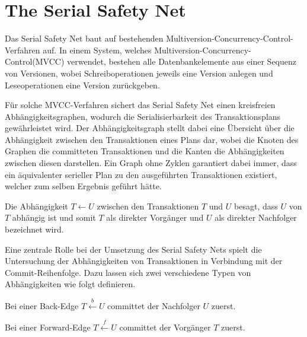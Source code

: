 \section{The Serial Safety Net}
Das Serial Safety Net baut auf bestehenden Multiversion-Concurrency-Control-Verfahren auf.
In einem System, welches Multiversion-Concurrency-Control(MVCC) verwendet, bestehen alle Datenbankelemente aus einer Sequenz von Versionen, wobei Schreiboperationen jeweils eine Version anlegen und Leseoperationen eine Version zurückgeben.

Für solche MVCC-Verfahren sichert das Serial Safety Net einen kreisfreien Abhängigkeitsgraphen, wodurch die Serialisierbarkeit des Transaktionsplans gewährleistet wird.
Der Abhängigkeitsgraph stellt dabei eine Übersicht über die Abhängigkeit zwischen den Transaktionen eines Plans dar, wobei die Knoten des Graphen die committeten Transaktionen und die Kanten die Abhängigkeiten zwischen diesen darstellen.
Ein Graph ohne Zyklen garantiert dabei immer, dass ein äquivalenter serieller Plan zu den ausgeführten Transaktionen existiert, welcher zum selben Ergebnis geführt hätte.

\begin{Definition}
	Die Abhängigkeit $T\leftarrow U$ zwischen den Transaktionen $T$ und $U$ besagt, dass $U$ von $T$ abhängig ist und somit $T$ als direkter Vorgänger und $U$ als direkter Nachfolger bezeichnet wird.
\end{Definition}

Eine zentrale Rolle bei der Umsetzung des Serial Safety Nets spielt die Untersuchung der Abhängigkeiten von Transaktionen in Verbindung mit der Commit-Reihenfolge.
Dazu lassen sich zwei verschiedene Typen von Abhängigkeiten wie folgt definieren.

\begin{Definition}
	Bei einer \textcolor{my-green}{Back-Edge} $T\xleftarrow{b} U$ committet der Nachfolger $U$ zuerst.
\end{Definition}

\begin{Definition}
	Bei einer \textcolor{my-blue}{Forward-Edge} $T\xleftarrow{f} U$ committet der Vorgänger $T$ zuerst.
\end{Definition}

